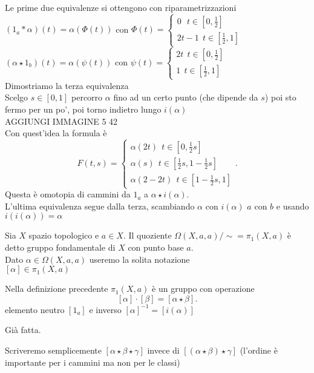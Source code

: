 \documentclass[12px]{article}
\begin{document}
\begin{dimo}
	Le prime due equivalenze si ottengono con riparametrizzazioni\\
	$(1_a*\alpha)(t) = \alpha(\Phi(t))$ con $\Phi(t) = \begin{cases}
		0\ \ \ t\in[0,\frac 12]\\
		2t - 1\ \ t\in[\frac 12,1]
	\end{cases}$\\
	$(\alpha\star 1_b)(t) = \alpha(\psi(t))$
	con  $\psi(t) = \begin{cases}
		2t \ \ t\in[0,\frac 12]\\
		1 \ \ t\in[\frac 12 ,1]
	\end{cases}$\\
	Dimostriamo la terza equivalenza\\
	Scelgo $s\in[0,1]$ percorro  $\alpha$ fino ad un certo punto (che dipende da $s$) poi sto fermo per un po', poi torno indietro lungo $i(\alpha)$\\
	AGGIUNGI IMMAGINE 5 42\\
	Con quest'idea la formula è 
	 \[
	F(t,s) = \begin{cases}
		\alpha(2t) \ \ t\in[0,\frac 12s]\\
		\alpha(s) \ \ t\in[\frac 12s, 1 - \frac 12s]\\
		\alpha(2-2t) \ \ t\in [1 - \frac 12s, 1]
	\end{cases}
	.\] 
	Questa è omotopia di cammini da $1_a$ a $\alpha\star i(\alpha)$.\\
	L'ultima equivalenza segue dalla terza, scambiando $\alpha$ con $i(\alpha)$ $a$ con $b$ e usando  $i(i(\alpha)) = \alpha$
\end{dimo}
\begin{defi}
	Sia $X$ spazio topologico e $a\in X.$ Il quoziente  $\Omega(X,a,a)/\sim=\pi_1(X,a)$ è detto gruppo fondamentale di $X$ con punto base $a$.\\
	Dato  $\alpha\in\Omega(X,a,a)$ useremo la solita notazione\\
	$[\alpha]\in\pi_1(X,a)$
\end{defi}
\begin{teo}
	Nella definizione precedente $\pi_1(X,a)$ è un gruppo con operazione
	\[
		[\alpha]\cdot[\beta] = [\alpha\star\beta]
	.\] 
	elemento neutro $[1_a]$ e inverso $[\alpha]^{-1} = [i(\alpha)]$
\end{teo}
\begin{dimo}
	Già fatta.
\end{dimo}
\begin{nota}
	Scriveremo semplicemente $[\alpha\star\beta\star\gamma]$ invece di  $[(\alpha\star\beta)\star\gamma]$ (l'ordine è importante per i cammini ma non per le classi)
\end{nota}
\end{document}
